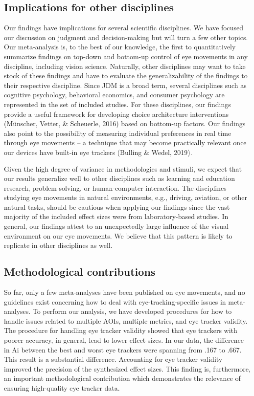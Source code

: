 \documentclass{article}
\begin{document}
\subsection{Implications for other disciplines}

Our findings have implications for several scientific disciplines. We have focused our discussion on judgment and decision-making but will turn a few other topics. Our meta-analysis is, to the best of our knowledge, the first to quantitatively summarize findings on top-down and bottom-up control of eye movements in any discipline, including vision science. Naturally, other disciplines may want to take stock of these findings and have to evaluate the generalizability of the findings to their respective discipline. Since JDM is a broad term, several disciplines such as cognitive psychology, behavioral economics, and consumer psychology are represented in the set of included studies. For these disciplines, our findings provide a useful framework for developing choice architecture interventions (Münscher, Vetter, \& Scheuerle, 2016) based on bottom-up factors. Our findings also point to the possibility of measuring individual preferences in real time through eye movements – a technique that may become practically relevant once our devices have built-in eye trackers (Bulling \& Wedel, 2019).    

Given the high degree of variance in methodologies and stimuli, we expect that our results generalize well to other disciplines such as learning and education research, problem solving, or human-computer interaction. The disciplines studying eye movements in natural environments, e.g., driving, aviation, or other natural tasks, should be cautious when applying our findings since the vast majority of the included effect sizes were from laboratory-based studies. In general, our findings attest to an unexpectedly large influence of the visual environment on our eye movements. We believe that this pattern is likely to replicate in other disciplines as well.


\subsection{Methodological contributions}

So far, only a few meta-analyses have been published on eye movements, and no guidelines exist concerning how to deal with eye-tracking-specific issues in meta-analyses. To perform our analysis, we have developed procedures for how to handle issues related to multiple AOIs, multiple metrics, and eye tracker validity. The procedure for handling eye tracker validity showed that eye trackers with poorer accuracy, in general, lead to lower effect sizes. In our data, the difference in Ai between the best and worst eye trackers were spanning from .167 to .667. This result is a substantial difference. Accounting for eye tracker validity improved the precision of the synthesized effect sizes. This finding is, furthermore, an important methodological contribution which demonstrates the relevance of ensuring high-quality eye tracker data.
\end{document}
